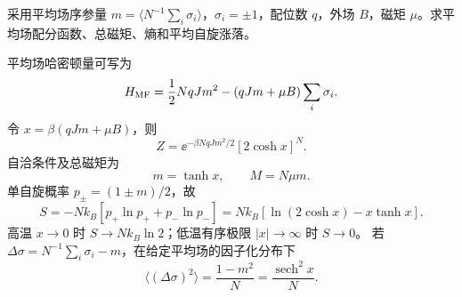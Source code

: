\begin{question}[15 分]
采用平均场序参量 $m=\langle N^{-1}\sum_i\sigma_i\rangle$，$\sigma_i=\pm1$，配位数 $q$，外场 $B$，磁矩 $\mu$。求平均场配分函数、总磁矩、熵和平均自旋涨落。
\begin{solution}
平均场哈密顿量可写为
\[H_{\rm MF}=\frac12NqJm^2-(qJm+\mu B)\sum_i\sigma_i.\]
令 $x=\beta(qJm+\mu B)$，则
\[\boxed{Z=\ee^{-\beta NqJm^2/2}[2\cosh x]^N}.\]
自洽条件及总磁矩为
\[\boxed{m=\tanh x},\qquad \boxed{M=N\mu m}.\]
单自旋概率 $p_\pm=(1\pm m)/2$，故
\[\boxed{S=-Nk_B[p_+\ln p_++p_-\ln p_-]=Nk_B[\ln(2\cosh x)-x\tanh x]}.\]
高温 $x\to0$ 时 $S\to Nk_B\ln2$；低温有序极限 $|x|\to\infty$ 时 $S\to0$。
若 $\Delta\sigma=N^{-1}\sum_i\sigma_i-m$，在给定平均场的因子化分布下
\[\boxed{\langle(\Delta\sigma)^2\rangle=\frac{1-m^2}{N}=\frac{\operatorname{sech}^2x}{N}}.\]
\end{solution}
\end{question}
